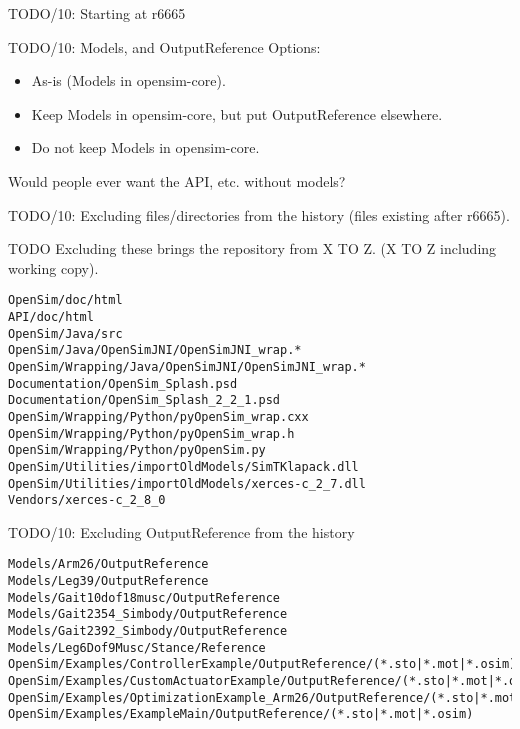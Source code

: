 \documentclass[pdf, 8pt]{beamer}
\def\NUMDECISIONS{10}
\begin{document}
\begin{frame}{TODO/\NUMDECISIONS: Starting at r6665}
\end{frame}

\begin{frame}{TODO/\NUMDECISIONS: Models, and OutputReference}
    Options:
    \begin{itemize}
            \item As-is (Models in opensim-core).
            \item Keep Models in opensim-core, but put OutputReference
                elsewhere.
            \item Do not keep Models in opensim-core.
    \end{itemize}
    Would people ever want the API, etc. without models?
\end{frame}

\begin{frame}[fragile]{TODO/\NUMDECISIONS: Excluding files/directories from the
history (files existing after r6665).}

TODO Excluding these brings the repository from X TO Z. (X TO Z including
working copy).
\begin{Verbatim}
OpenSim/doc/html
API/doc/html
OpenSim/Java/src
OpenSim/Java/OpenSimJNI/OpenSimJNI_wrap.*
OpenSim/Wrapping/Java/OpenSimJNI/OpenSimJNI_wrap.*
Documentation/OpenSim_Splash.psd
Documentation/OpenSim_Splash_2_2_1.psd
OpenSim/Wrapping/Python/pyOpenSim_wrap.cxx
OpenSim/Wrapping/Python/pyOpenSim_wrap.h
OpenSim/Wrapping/Python/pyOpenSim.py
OpenSim/Utilities/importOldModels/SimTKlapack.dll
OpenSim/Utilities/importOldModels/xerces-c_2_7.dll
Vendors/xerces-c_2_8_0
\end{Verbatim}

\end{frame}

\begin{frame}[fragile]{TODO/\NUMDECISIONS: Excluding OutputReference from the history}

\begin{Verbatim}
Models/Arm26/OutputReference
Models/Leg39/OutputReference
Models/Gait10dof18musc/OutputReference
Models/Gait2354_Simbody/OutputReference
Models/Gait2392_Simbody/OutputReference
Models/Leg6Dof9Musc/Stance/Reference
OpenSim/Examples/ControllerExample/OutputReference/(*.sto|*.mot|*.osim)
OpenSim/Examples/CustomActuatorExample/OutputReference/(*.sto|*.mot|*.osim)
OpenSim/Examples/OptimizationExample_Arm26/OutputReference/(*.sto|*.mot|*.osim)
OpenSim/Examples/ExampleMain/OutputReference/(*.sto|*.mot|*.osim)
\end{Verbatim}

\end{frame}
\end{document}
